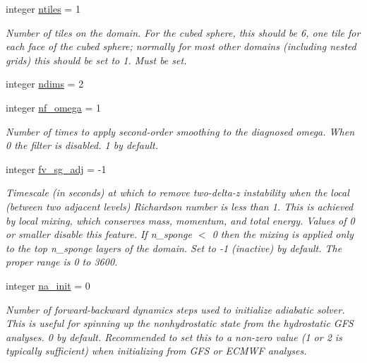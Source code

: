 \begin{DoxyCompactItemize}
integer \hyperlink{structfv__arrays__mod_1_1fv__flags__type_a42bc0b8fb2b3f05963d42058ea9da803}{ntiles} = 1
\begin{DoxyCompactList}\small\item\em Number of tiles on the domain. For the cubed sphere, this should be 6, one tile for each face of the cubed sphere; normally for most other domains (including nested grids) this should be set to 1. Must be set. \end{DoxyCompactList}\item 
integer \hyperlink{structfv__arrays__mod_1_1fv__flags__type_aeff1e1f69391e36b56e0927e5d6bc170}{ndims} = 2
\item 
integer \hyperlink{structfv__arrays__mod_1_1fv__flags__type_abd162a3a59769c31fc81069d02e788ed}{nf\-\_\-omega} = 1
\begin{DoxyCompactList}\small\item\em Number of times to apply second-\/order smoothing to the diagnosed omega. When 0 the filter is disabled. 1 by default. \end{DoxyCompactList}\item 
integer \hyperlink{structfv__arrays__mod_1_1fv__flags__type_a9c0bc226ee0b31ea4e9454e4d5ddd518}{fv\-\_\-sg\-\_\-adj} = -\/1
\begin{DoxyCompactList}\small\item\em Timescale (in seconds) at which to remove two-\/delta-\/z instability when the local (between two adjacent levels) Richardson number is less than 1. This is achieved by local mixing, which conserves mass, momentum, and total energy. Values of 0 or smaller disable this feature. If n\-\_\-sponge $<$ 0 then the mixing is applied only to the top n\-\_\-sponge layers of the domain. Set to -\/1 (inactive) by default. The proper range is 0 to 3600. \end{DoxyCompactList}\item 
integer \hyperlink{structfv__arrays__mod_1_1fv__flags__type_acac30a38b5ffe8adef26e581a215157e}{na\-\_\-init} = 0
\begin{DoxyCompactList}\small\item\em Number of forward-\/backward dynamics steps used to initialize adiabatic solver. This is useful for spinning up the nonhydrostatic state from the hydrostatic G\-F\-S analyses. 0 by default. Recommended to set this to a non-\/zero value (1 or 2 is typically sufficient) when initializing from G\-F\-S or E\-C\-M\-W\-F analyses. \end{DoxyCompactList}\item 

\end{DoxyCompactItemize}
